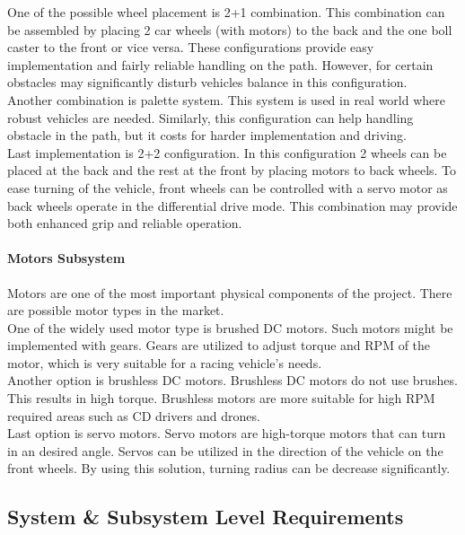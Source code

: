 \documentclass[a4paper,12pt]{article}
\begin{document}
			One of the possible wheel placement is 2+1 combination. This combination can be assembled by placing 2 car wheels (with motors) to the back and the one boll caster to the front or vice versa. These configurations provide easy implementation and fairly reliable handling on the path. However, for certain obstacles may significantly disturb vehicles balance in this configuration.\\

			Another combination is palette system. This system is used in real world where robust vehicles are needed. Similarly, this configuration can help handling obstacle in the path, but it costs for harder implementation and driving.\\

Last implementation is 2+2 configuration. In this configuration 2 wheels can be placed at the back and the rest at the front by placing motors to back wheels. To ease turning of the vehicle, front wheels can be controlled with a servo motor as back wheels operate in the differential drive mode. This combination may provide both enhanced grip and reliable	 operation. \\
		\paragraph{Motors Subsystem}
			Motors are one of the most important physical components of the project. There are possible motor types in the market.\\

			One of the widely used motor type is brushed DC motors. Such motors might be implemented with gears. Gears are utilized to adjust torque and RPM of the motor, which is very suitable for a racing vehicle's needs. \\

			Another option is brushless DC motors. Brushless DC motors do not use brushes. This results in high torque. Brushless motors are more suitable for high RPM required areas such as CD drivers and drones.\\

			Last option is servo motors. Servo motors are high-torque motors that can turn in an desired angle. Servos can be utilized in the direction of the vehicle on the front wheels. By using this solution, turning radius can be decrease significantly.\\

\subsection{System \& Subsystem Level Requirements}
		
\end{document}
